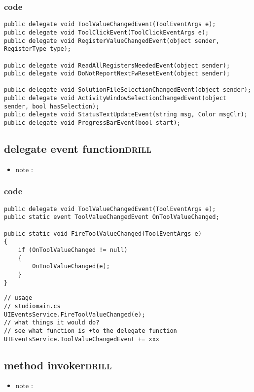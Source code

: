 \documentclass[11pt]{article}
\begin{document}
\subsubsection{code}
\label{sec:org996746b}
\begin{verbatim}
public delegate void ToolValueChangedEvent(ToolEventArgs e);
public delegate void ToolClickEvent(ToolClickEventArgs e);
public delegate void RegisterValueChangedEvent(object sender, RegisterType type);

public delegate void ReadAllRegistersNeededEvent(object sender);
public delegate void DoNotReportNextFwResetEvent(object sender);

public delegate void SolutionFileSelectionChangedEvent(object sender);
public delegate void ActivityWindowSelectionChangedEvent(object sender, bool hasSelection);
public delegate void StatusTextUpdateEvent(string msg, Color msgClr);
public delegate void ProgressBarEvent(bool start);

\end{verbatim}

\subsection{delegate event function\hfill{}\textsc{drill}}
\label{sec:orgf53dddc}
\begin{itemize}
\item note :
\end{itemize}
\subsubsection{code}
\label{sec:orge569423}
\begin{verbatim}
public delegate void ToolValueChangedEvent(ToolEventArgs e);
public static event ToolValueChangedEvent OnToolValueChanged;

public static void FireToolValueChanged(ToolEventArgs e)
{
    if (OnToolValueChanged != null)
    {
        OnToolValueChanged(e);
    }
}

\end{verbatim}
\begin{verbatim}
// usage
// studiomain.cs
UIEventsService.FireToolValueChanged(e);
// what things it would do?
// see what function is +to the delegate function
UIEventsService.ToolValueChangedEvent += xxx
\end{verbatim}

\subsection{method invoker\hfill{}\textsc{drill}}
\label{sec:orgd53d5ce}
\begin{itemize}
\item note :
\end{itemize}
\end{document}
